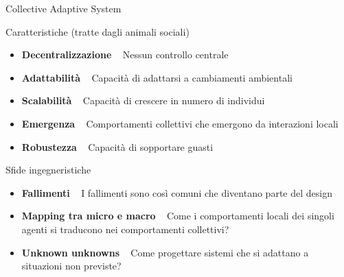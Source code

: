 \documentclass[presentation, 10pt,aspectratio=169]{beamer}\mode<presentation>{\usetheme{AMSBolognaFC}}
\begin{document}
\begin{frame}{Collective Adaptive System}
\begin{alertblock}{Caratteristiche (tratte dagli animali sociali)}
	\begin{itemize}
		\item \textbf{Decentralizzazione} \faArrowRight ~ Nessun controllo centrale
		\item \textbf{Adattabilità} \faArrowRight ~ Capacità di adattarsi a cambiamenti ambientali
		\item \textbf{Scalabilità} \faArrowRight ~ Capacità di crescere in numero di individui 
		\item \textbf{Emergenza} \faArrowRight ~ Comportamenti collettivi che emergono da interazioni locali
		\item \textbf{Robustezza} \faArrowRight ~ Capacità di sopportare guasti
	\end{itemize}	
\end{alertblock}

\begin{exampleblock}{Sfide ingegneristiche}
	\begin{itemize}
		\item \textbf{Fallimenti} \faArrowRight ~ I fallimenti sono così comuni che diventano parte del design
		\item \textbf{Mapping tra micro e macro} \faArrowRight ~ Come i comportamenti locali dei singoli agenti si traducono nei comportamenti collettivi?
		\item \textbf{Unknown unknowns} \faArrowRight ~ Come progettare sistemi che si adattano a situazioni non previste?
	\end{itemize}
\end{exampleblock}
\end{frame}
\end{document}
